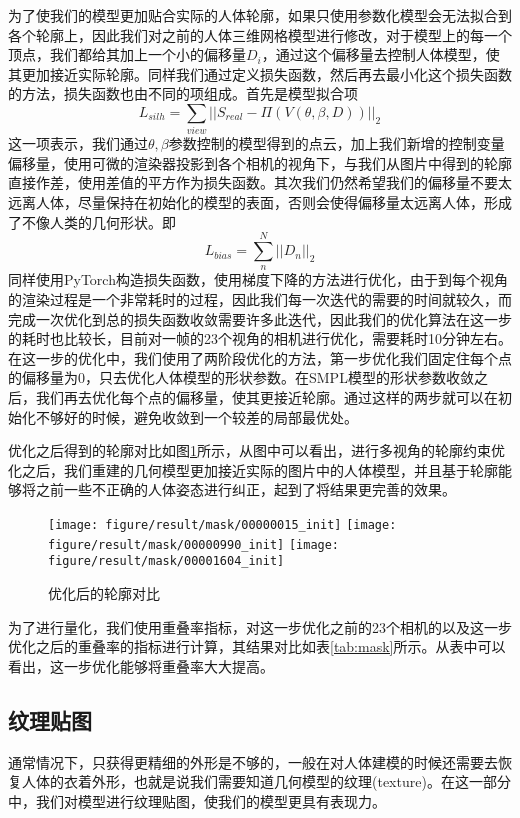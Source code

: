 为了使我们的模型更加贴合实际的人体轮廓，如果只使用参数化模型会无法拟合到各个轮廓上，因此我们对之前的人体三维网格模型进行修改，对于模型上的每一个顶点，我们都给其加上一个小的偏移量\(D_i\)，通过这个偏移量去控制人体模型，使其更加接近实际轮廓。同样我们通过定义损失函数，然后再去最小化这个损失函数的方法，损失函数也由不同的项组成。首先是模型拟合项
\begin{equation}
    L_{silh} = \sum_{view} || S_{real} - \Pi(V(\theta, \beta, D)) ||_2
\end{equation}
这一项表示，我们通过\(\theta, \beta\)参数控制的模型得到的点云，加上我们新增的控制变量偏移量，使用可微的渲染器投影到各个相机的视角下，与我们从图片中得到的轮廓直接作差，使用差值的平方作为损失函数。其次我们仍然希望我们的偏移量不要太远离人体，尽量保持在初始化的模型的表面，否则会使得偏移量太远离人体，形成了不像人类的几何形状。即
\begin{equation}
    L_{bias} = \sum_n^N || D_n ||_2
\end{equation}
同样使用PyTorch构造损失函数，使用梯度下降的方法进行优化，由于到每个视角的渲染过程是一个非常耗时的过程，因此我们每一次迭代的需要的时间就较久，而完成一次优化到总的损失函数收敛需要许多此迭代，因此我们的优化算法在这一步的耗时也比较长，目前对一帧的23个视角的相机进行优化，需要耗时10分钟左右。在这一步的优化中，我们使用了两阶段优化的方法，第一步优化我们固定住每个点的偏移量为0，只去优化人体模型的形状参数。在SMPL模型的形状参数收敛之后，我们再去优化每个点的偏移量，使其更接近轮廓。通过这样的两步就可以在初始化不够好的时候，避免收敛到一个较差的局部最优处。

优化之后得到的轮廓对比如图\ref{fig:maskout}所示，从图中可以看出，进行多视角的轮廓约束优化之后，我们重建的几何模型更加接近实际的图片中的人体模型，并且基于轮廓能够将之前一些不正确的人体姿态进行纠正，起到了将结果更完善的效果。
\begin{figure}[htbp]
    \centering
    \texttt{[image: figure/result/mask/00000015\_init]} \hfill
    \texttt{[image: figure/result/mask/00000990\_init]} \hfill
    \texttt{[image: figure/result/mask/00001604\_init]}
    \caption{\label{fig:maskout} 优化后的轮廓对比}
\end{figure}
为了进行量化，我们使用重叠率指标，对这一步优化之前的23个相机的以及这一步优化之后的重叠率的指标进行计算，其结果对比如表\ref{tab:mask}所示。从表中可以看出，这一步优化能够将重叠率大大提高。

\subsection{纹理贴图}
通常情况下，只获得更精细的外形是不够的，一般在对人体建模的时候还需要去恢复人体的衣着外形，也就是说我们需要知道几何模型的纹理(texture)。在这一部分中，我们对模型进行纹理贴图，使我们的模型更具有表现力。

